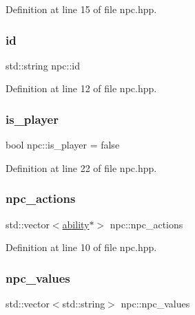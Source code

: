 Definition at line 15 of file npc.\+hpp.

\mbox{\label{classnpc_af2544175f28e31abaa3587d7807aa60c}} 
\subsubsection{\texorpdfstring{id}{id}}
{\footnotesize\ttfamily std\+::string npc\+::id\hspace{0.3cm}{\ttfamily [private]}}



Definition at line 12 of file npc.\+hpp.

\mbox{\label{classnpc_a3815e143f7d384cb9bd0a1ab45c729a5}} 
\subsubsection{\texorpdfstring{is\+\_\+player}{is\_player}}
{\footnotesize\ttfamily bool npc\+::is\+\_\+player = false\hspace{0.3cm}{\ttfamily [private]}}



Definition at line 22 of file npc.\+hpp.

\mbox{\label{classnpc_afc25127e7611064526758d66e78e4e29}} 
\subsubsection{\texorpdfstring{npc\+\_\+actions}{npc\_actions}}
{\footnotesize\ttfamily std\+::vector$<$\hyperlink{classability}{ability}$\ast$$>$ npc\+::npc\+\_\+actions\hspace{0.3cm}{\ttfamily [private]}}



Definition at line 10 of file npc.\+hpp.

\mbox{\label{classnpc_ae50304639c2715b89dc1902c59830acf}} 
\subsubsection{\texorpdfstring{npc\+\_\+values}{npc\_values}}
{\footnotesize\ttfamily std\+::vector$<$std\+::string$>$ npc\+::npc\+\_\+values\hspace{0.3cm}{\ttfamily [private]}}



